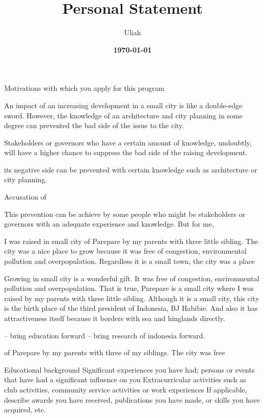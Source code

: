 \documentclass[11pt]{simart} %
\title{
\textbf{Personal Statement} \\
} %
\date{\textbf{\today}}
\author{Uliah}
\begin{document}
\maketitle %

 Motivations with which you apply for this program

An impact of an increasing development in a small city is like a double-edge sword.
However, the knowledge of an architecture and city planning in some degree can prevented the bad side of the issue to the city.

Stakeholders or governors who have a certain amount of knowledge, undoubtly, will have a higher chance to suppress the bad side of the raising development.

its negative side can be prevented with certain knowledge such as architecture or city planning.

Accusation of

This prevention can be achieve by some people who might be stakeholders or governors with an adequate experience and knowledge. But for me,


I was raised in small city of Parepare by my parents with three little sibling. The city was a nice place to grow because it was free of congestion, environmental pollution and overpopulation. Regardless it is a small town, the city was a place


Growing in small city is a wonderful gift. It was free of congestion, environmental pollution and overpopulation. That is true, Parepare is a small city where I was raised by my parents with three little sibling. Although it is a small city, this city is the birth place of the third president of Indonesia, BJ Habibie. And also it has attractiveness itself because it borders with sea and hinglands directly.

-- bring education forward
-- bring research of indonesia forward.

of Parepare by my parents with three of my siblings.
The city was free

 Educational background
 Significant experiences you have had; persons or events that have had a significant influence on you
 Extracurricular activities such as club activities, community service activities or work experiences
 If applicable, describe awards you have received, publications you have made, or skills you have acquired, etc.
\end{document}
